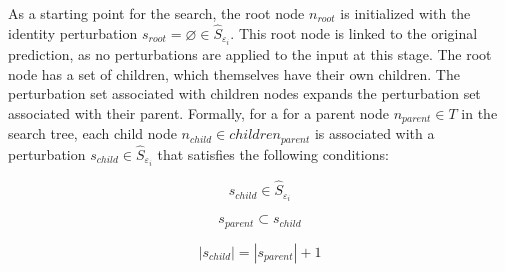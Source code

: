 
As a starting point for the search, the root node $n_{root}$ is initialized with the identity perturbation $s_{root} = \varnothing \in \hat{S}_{\varepsilon_i}$. This root node is linked to the original prediction, as no perturbations are applied to the input at this stage. 
The root node has a set of children, which themselves have their own children. The perturbation set associated with children nodes expands the perturbation set associated with their parent. Formally, for a for a parent node $n_{parent} \in T$ in the search tree, each child node $n_{child} \in children_{parent}$ is associated with a perturbation $s_{child} \in \hat{S}_{\varepsilon_i}$ that satisfies the following conditions:

\begin{equation}
    \label{e_child_1}
    s_{child} \in \hat{S}_{\varepsilon_i}
\end{equation}

\begin{equation}
    \label{e_child_2}
    s_{parent} \subset s_{child}
\end{equation}

\begin{equation}
    \label{e_child_3}
    |s_{child}| = |s_{parent}| + 1
\end{equation}

